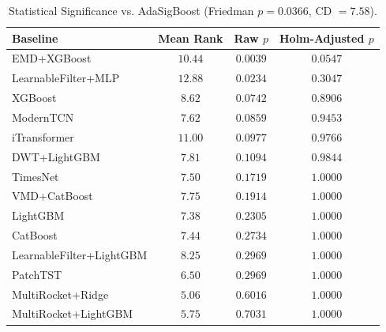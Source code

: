 \begin{table}[t]
\centering
\caption{Statistical Significance vs. AdaSigBoost (Friedman $p = 0.0366$, CD $= 7.58$).}
\label{tab:stats_sig}
\begin{tabular}{lccc}
\toprule
Baseline & Mean Rank & Raw $p$ & Holm-Adjusted $p$ \\
\midrule
EMD+XGBoost & $10.44$ & $0.0039$ & $0.0547$ \\
LearnableFilter+MLP & $12.88$ & $0.0234$ & $0.3047$ \\
XGBoost & $8.62$ & $0.0742$ & $0.8906$ \\
ModernTCN & $7.62$ & $0.0859$ & $0.9453$ \\
iTransformer & $11.00$ & $0.0977$ & $0.9766$ \\
DWT+LightGBM & $7.81$ & $0.1094$ & $0.9844$ \\
TimesNet & $7.50$ & $0.1719$ & $1.0000$ \\
VMD+CatBoost & $7.75$ & $0.1914$ & $1.0000$ \\
LightGBM & $7.38$ & $0.2305$ & $1.0000$ \\
CatBoost & $7.44$ & $0.2734$ & $1.0000$ \\
LearnableFilter+LightGBM & $8.25$ & $0.2969$ & $1.0000$ \\
PatchTST & $6.50$ & $0.2969$ & $1.0000$ \\
MultiRocket+Ridge & $5.06$ & $0.6016$ & $1.0000$ \\
MultiRocket+LightGBM & $5.75$ & $0.7031$ & $1.0000$ \\
\bottomrule
\end{tabular}
\end{table}
